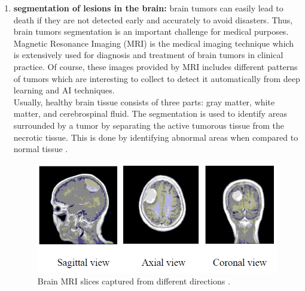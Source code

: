 \documentclass[11pt, openany]{report}
\theoremstyle{plain}
\theoremstyle{definition}
\theoremstyle{remark}
\begin{document}
\begin{enumerate}
\item \textbf{segmentation of lesions in the brain:} brain tumors can easily lead to death if they are not detected early and accurately to avoid disasters. Thus, brain tumors segmentation is an important challenge for medical purposes. Magnetic Resonance Imaging (MRI) is the medical imaging technique which is extensively used for diagnosis and treatment of brain tumors in clinical practice. Of course, these images provided by MRI includes different patterns of tumors which are interesting to collect to detect it automatically from deep learning and AI techniques. \\
Usually, healthy brain tissue consists of three parts: gray matter, white matter, and cerebrospinal fluid. The segmentation is used to identify areas surrounded by a tumor by separating the active tumorous tissue from the necrotic tissue. This is done by identifying abnormal areas when compared to normal tissue \cite{brain-tumor-1}. 

\begin{figure}[h]
  \centering
  \includegraphics[scale=0.5]{figures/brain-images-examples.png}
  \caption{Brain MRI slices captured from different directions \cite{brain-tumor-1}.}
  \label{fig:brain-example}
\end{figure}


\end{enumerate}
\end{document}
